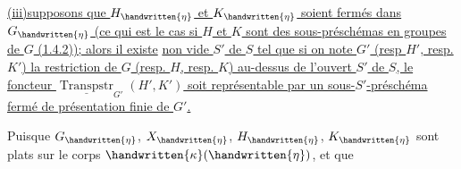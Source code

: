 \uline{(iii)supposons que $H_{\handwritten{\eta}}$ et $K_{\handwritten{\eta}}$ soient fermés dans $G_{\handwritten{\eta}}$ (ce qui est le cas si $H$ et $K$ sont des sous-préschémas en groupes de $G$ (1.4.2)); alors il existe}  \uline{non vide $S'$ de $S$ tel que si on note $G'$ (resp $H'$, resp. $K'$) la restriction de $G$ (resp. $H$, resp. $K$) au-dessus de l'ouvert $S'$ de $S$, le foncteur $\underline{\operatorname{Transpstr}}_{G'}(H',K')$ soit représentable par un sous-$S'$-préschéma fermé de présentation finie de $G'$.}

Puisque $G_{\handwritten{\eta}}$, $X_{\handwritten{\eta}}$, $H_{\handwritten{\eta}}$, $K_{\handwritten{\eta}}$ sont plats sur le corps $\handwritten{\kappa}(\handwritten{\eta})$, et que
